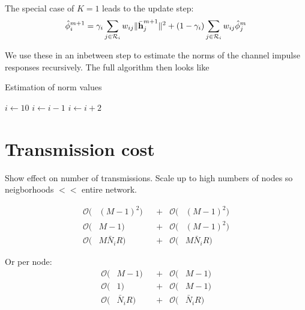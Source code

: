 \documentclass{article}
\begin{document}
The special case of \(K=1\) leads to the update step:
\begin{equation}
  \hat{\phi}_i^{m+1} = \gamma_i \sum_{j \in \mathcal{R}_i} w_{ij} \| \bar{\bm{\mathrm{h}}}_j^{m+1} \|^2 + (1-\gamma_i) \sum_{j \in \mathcal{R}_i} w_{ij} \hat{\phi}_j^m
\end{equation}

We use these in an inbetween step to estimate the norms of the channel impulse responses recursively. The full algorithm then looks like

\begin{algorithm}
  \caption{Estimation of norm values}\label{alg:davg_norm_est}
  $i\gets 10$\;
  {
      $i\gets i-1$\;
  }{
      {
          $i\gets i+2$\;
      }
  }
\end{algorithm}


\section{Transmission cost}
\label{sec:transcost}
Show effect on number of transmissions. Scale up to high numbers of nodes so neigborhoods \(<<\) entire network.

\begin{align}
  \mathcal{O}(&(M-1)^2) & &+ & \mathcal{O}(&(M-1)^2)\\
  \mathcal{O}(&M-1) & &+ & \mathcal{O}(&(M-1)^2)\\
  \mathcal{O}(&M \bar{N}_i R) & &+ & \mathcal{O}(&M \bar{N}_i R)
\end{align}

Or per node:
\begin{align}
  \mathcal{O}(&M-1) & &+ & \mathcal{O}(&M-1)\\
  \mathcal{O}(&1) & &+ & \mathcal{O}(&M-1)\\
  \mathcal{O}(&\bar{N}_i R) & &+ & \mathcal{O}(&\bar{N}_i R)
\end{align}
\end{document}
